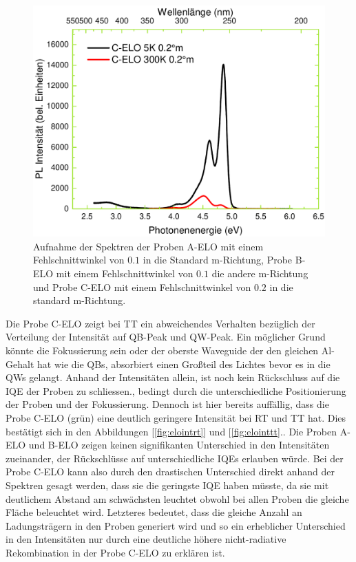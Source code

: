 \begin{figure}[htb]
\begin{minipage}[t]{0.30\textwidth}
    \includegraphics[width=\linewidth]{Bilder/TS4045/celo.pdf}
  \end{minipage}
	\caption{Aufnahme der Spektren der Proben A-ELO mit einem Fehlschnittwinkel von $0.1$ in die Standard m-Richtung, Probe B-ELO mit einem Fehlschnittwinkel von $0.1$ die andere m-Richtung und Probe C-ELO mit einem Fehlschnittwinkel von $0.2$ in die standard m-Richtung. }
	\label{fig:spectraselo}
\end{figure}
\noindent 
%
Die Probe C-ELO zeigt bei TT ein abweichendes Verhalten bezüglich der Verteilung der Intensität auf QB-Peak und QW-Peak. Ein möglicher Grund könnte die Fokussierung sein oder der oberste Waveguide der den gleichen Al-Gehalt hat wie die QBs, absorbiert einen Großteil des Lichtes bevor es in die QWs gelangt. 
Anhand der Intensitäten allein, ist noch kein Rückschluss auf die IQE der Proben zu schliessen., bedingt durch die unterschiedliche Positionierung der Proben und der Fokussierung. Dennoch ist hier bereits auffällig, dass die Probe C-ELO (grün) eine deutlich geringere Intensität bei RT und TT hat. Dies bestätigt sich in den Abbildungen [\ref{fig:elointrt}] und [\ref{fig:elointtt}.. Die Proben A-ELO und B-ELO zeigen keinen signifikanten Unterschied in den Intensitäten zueinander, der Rückschlüsse auf unterschiedliche IQEs erlauben würde.  Bei der Probe C-ELO kann also durch den drastischen Unterschied direkt anhand der Spektren gesagt werden, dass sie die geringste IQE haben müsste, da sie mit deutlichem Abstand am schwächsten leuchtet obwohl bei allen Proben die gleiche Fläche beleuchtet wird. Letzteres bedeutet, dass die gleiche Anzahl an Ladungsträgern in den Proben generiert wird und so ein erheblicher Unterschied in den Intensitäten nur durch eine deutliche höhere nicht-radiative Rekombination in der Probe C-ELO zu erklären ist.
